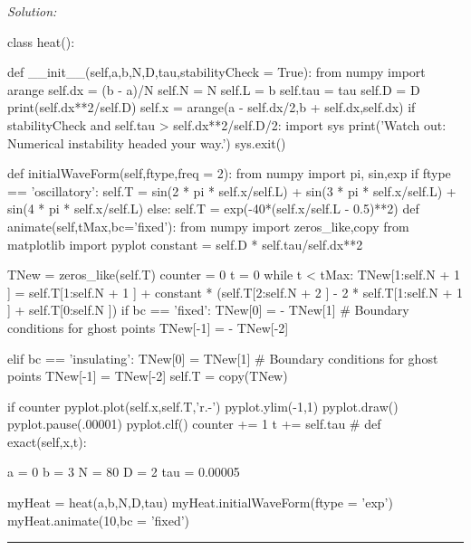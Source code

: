 \ifsolutions
\textit{Solution:}\\
\begin{codeexample}
\begin{VerbatimOut}{\listingFile}
class heat():


    def __init__(self,a,b,N,D,tau,stabilityCheck = True):
        from numpy import arange
        self.dx = (b - a)/N
        self.N = N
        self.L  = b
        self.tau = tau
        self.D = D
        print(self.dx**2/self.D)        
        self.x = arange(a - self.dx/2,b + self.dx,self.dx)
        if stabilityCheck and self.tau > self.dx**2/self.D/2:
            import sys
            print('Watch out: Numerical instability headed your way.')
            sys.exit()

    def initialWaveForm(self,ftype,freq = 2):
        from numpy import pi, sin,exp
        if ftype == 'oscillatory':
            self.T = sin(2 * pi * self.x/self.L) + sin(3 * pi * self.x/self.L) + sin(4 * pi * self.x/self.L)
        else:
            self.T = exp(-40*(self.x/self.L - 0.5)**2)
    def animate(self,tMax,bc='fixed'):
        from numpy import zeros_like,copy
        from matplotlib import pyplot
        constant = self.D * self.tau/self.dx**2
        
        TNew = zeros_like(self.T)
        counter = 0
        t = 0
        while t < tMax:
            TNew[1:self.N + 1 ] = self.T[1:self.N + 1 ] + constant * (self.T[2:self.N + 2 ] - 2 * self.T[1:self.N + 1 ] + self.T[0:self.N ])
            if bc == 'fixed':
                TNew[0] = - TNew[1] # Boundary conditions for ghost points
                TNew[-1] = - TNew[-2]

            elif bc == 'insulating':
                TNew[0] =  TNew[1] # Boundary conditions for ghost points
                TNew[-1] =  TNew[-2]
            self.T = copy(TNew)

            if counter %
                pyplot.plot(self.x,self.T,'r.-')
                pyplot.ylim(-1,1)
                pyplot.draw()
                pyplot.pause(.00001)
                pyplot.clf()
            counter += 1
            t += self.tau
            #    def exact(self,x,t):
        


a = 0 
b = 3
N = 80
D = 2
tau = 0.00005


myHeat = heat(a,b,N,D,tau)
myHeat.initialWaveForm(ftype = 'exp')
myHeat.animate(10,bc = 'fixed')
\end{VerbatimOut}
\end{codeexample}
\else
\noindent\rule{5 in}{0.01 in}
\fi

